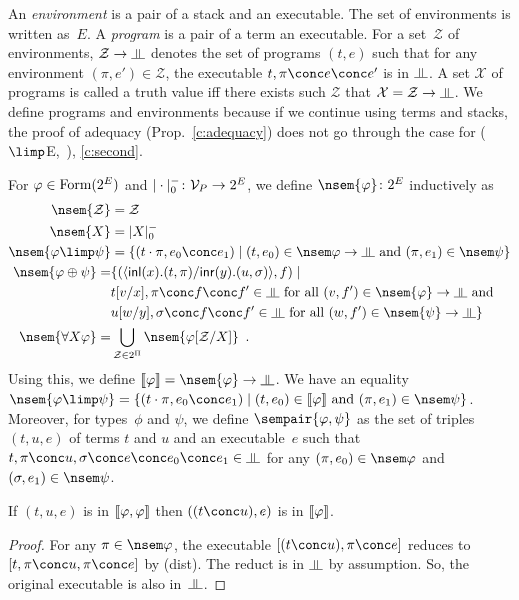 An \textit{environment} is a pair of a stack and an executable.
The set of environments is written as~$E$.
A \textit{program} is a pair of a term an executable.
For a set~$\mathcal Z$ of environments, $\mathcal Z\rightarrow\bbot$ denotes
the set of programs $(t,e)$ such that
for any environment $(\pi,e')\in \mathcal Z$,
the executable $t,\pi\conc e \conc e'$ is in $\bbot$.
A set $\mathcal X$ of programs is called a truth value
iff there exists
such $\mathcal Z$ that $\mathcal X = \mathcal Z\rightarrow \bbot$.
We define programs and environments because if we continue using
terms and stacks, the proof of adequacy (Prop.~\ref{c:adequacy}) does
not go through the case for
($\limp$E,~\textminus), \ref{c:second}.

For $\varphi\in\mathop{\text{Form}}(2^E)$ and $|\cdot|^-_0\colon\mathcal V_P\rightarrow 2^E$,
we define $\nsem{\phi}\colon 
2^E$ inductively as
\begin{align*}
 \nsem{\mathcal Z} &= \mathcal Z \\
 \nsem{X}&= |X|_0^- \\
 \nsem{\phi\limp\psi}&=
 \{(t\cdot\pi, e_0\conc e_1)\mid
 (t,e_0)\in\nsem\phi\rightarrow\bbot \text{ and }(\pi,e_1)\in\nsem\psi\}\\
 \nsem{\phi\oplus\psi}=& \{(\mats x{t}{\pi}y{u}{\sigma}, f)\mid\\ &
 t[v/x],\pi\conc f\conc f'\in\bbot \text{ for all } (v,f')\in\nsem{\phi}\rightarrow\bbot\text{
 and }\\ &
 u[w/y],\sigma\conc f\conc f'\in\bbot \text{ for all } (w,f')\in\nsem{\psi}\rightarrow\bbot\}
 \\
 \nsem{\forall X\phi}=&
 \bigcup_{\mathcal Z\in 2^\Pi} \nsem{\phi[\mathcal Z/X]}\enspace.
\end{align*}
Using this, we define $\sem \phi=\nsem{\phi}\rightarrow\bbot$.
We have an equality
$\nsem{\phi\limp\psi} = \{(t\cdot\pi, e_0\conc e_1)\mid
(t,e_0)\in\sem\phi\text{ and }(\pi,e_1)\in\nsem\psi\}$.
Moreover, for types~$\phi$ and $\psi$, we define $\sempair{\phi,\psi}$
as the set of triples $(t,u,e)$ of terms $t$ and $u$ and an executable~$e$
such
that
$t,\pi\conc u,\sigma\conc e\conc e_0\conc e_1
\in\bbot$ for any $(\pi,e_0)\in\nsem\phi$
and $(\sigma,e_1)\in\nsem\psi$.

\begin{proposition}
 \label{squash}
 If $(t,u,e)$ is in $\llbracket{\varphi,\varphi}\rrbracket$ then $((t\conc u), e)$ is in
 $\llbracket{\varphi}\rrbracket$.
\end{proposition}
\begin{proof}
 For any $\pi\in\nsem\phi$,
 the executable $[(t\conc u),\pi\conc e]$ reduces to $[t,\pi\conc
 u,\pi\conc e]$ by (dist).
 The reduct is in $\bbot$ by assumption.
 So, the original executable is also in~$\bbot$.
\end{proof}

